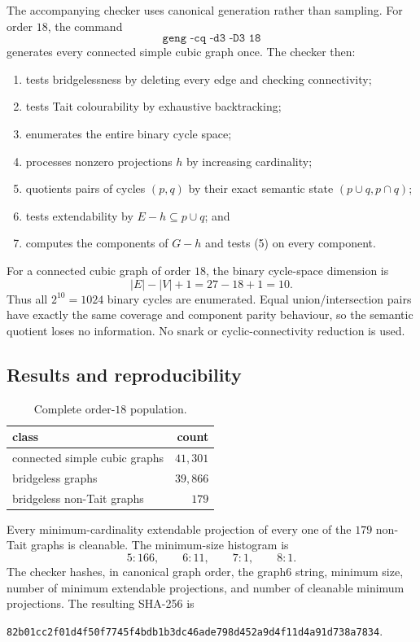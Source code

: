 \documentclass[11pt]{article}
\theoremstyle{definition}
\theoremstyle{remark}
\begin{document}
The accompanying checker uses canonical generation rather than sampling.
For order \(18\), the command
\[
\texttt{geng -cq -d3 -D3 18}
\]
generates every connected simple cubic graph once.  The checker then:
\begin{enumerate}
  \item tests bridgelessness by deleting every edge and checking
        connectivity;
  \item tests Tait colourability by exhaustive backtracking;
  \item enumerates the entire binary cycle space;
  \item processes nonzero projections \(h\) by increasing cardinality;
  \item quotients pairs of cycles \((p,q)\) by their exact semantic state
        \((p\cup q,p\cap q)\);
  \item tests extendability by \(E-h\subseteq p\cup q\); and
  \item computes the components of \(G-h\) and tests (5) on every
        component.
\end{enumerate}

For a connected cubic graph of order \(18\), the binary cycle-space
dimension is
\[
                  |E|-|V|+1=27-18+1=10.
\]
Thus all \(2^{10}=1024\) binary cycles are enumerated.  Equal
union/intersection pairs have exactly the same coverage and component
parity behaviour, so the semantic quotient loses no information.
No snark or cyclic-connectivity reduction is used.

\subsection{Results and reproducibility}

\begin{table}[h]
\centering
\begin{tabular}{lr}
\toprule
class & count\\
\midrule
connected simple cubic graphs & \(41{,}301\)\\
bridgeless graphs & \(39{,}866\)\\
bridgeless non-Tait graphs & \(179\)\\
\bottomrule
\end{tabular}
\caption{Complete order-\(18\) population.}
\end{table}

Every minimum-cardinality extendable projection of every one of the
\(179\) non-Tait graphs is cleanable.  The minimum-size histogram is
\[
             5:166,\qquad 6:11,\qquad 7:1,\qquad 8:1.
\]
The checker hashes, in canonical graph order, the graph6 string, minimum
size, number of minimum extendable projections, and number of cleanable
minimum projections.  The resulting SHA-256 is
\begin{center}
\texttt{82b01cc2f01d4f50f7745f4bdb1b3dc46ade798d452a9d4f11d4a91d738a7834}.
\end{center}
\end{document}
